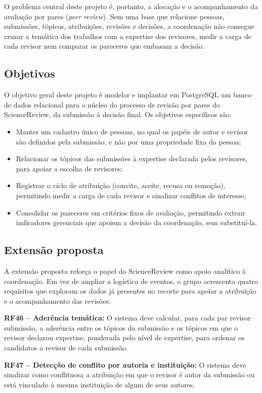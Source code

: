 \documentclass[12pt,a4paper]{article}
\begin{document}
O problema central deste projeto é, portanto, a alocação e o acompanhamento da
avaliação por pares (\textit{peer review}). Sem uma base que relacione pessoas,
submissões, tópicos, atribuições, revisões e decisões, a coordenação não consegue
cruzar a temática dos trabalhos com a expertise dos revisores, medir a carga de cada
revisor nem comparar os pareceres que embasam a decisão.

\subsection{Objetivos}
O objetivo geral deste projeto é modelar e implantar em PostgreSQL um banco de dados
relacional para o núcleo do processo de revisão por pares do ScienceReview, da
submissão à decisão final. Os objetivos específicos são:
\begin{itemize}
    \item Manter um cadastro único de pessoas, no qual os papéis de autor e revisor são definidos pela submissão, e não por uma propriedade fixa da pessoa;
    \item Relacionar os tópicos das submissões à expertise declarada pelos revisores, para apoiar a escolha de revisores;
    \item Registrar o ciclo de atribuição (convite, aceite, recusa ou remoção), permitindo medir a carga de cada revisor e sinalizar conflitos de interesse;
    \item Consolidar os pareceres em critérios fixos de avaliação, permitindo extrair indicadores gerenciais que apoiem a decisão da coordenação, sem substituí-la.
\end{itemize}

\subsection{Extensão proposta}\label{sec:extensao}
A extensão proposta reforça o papel do ScienceReview como apoio analítico à
coordenação. Em vez de ampliar a logística de eventos, o grupo acrescenta quatro
requisitos que exploram os dados já presentes no recorte para apoiar a atribuição e o
acompanhamento das revisões:

\textbf{RF46 -- Aderência temática:} O sistema deve calcular, para cada par
revisor--submissão, a aderência entre os tópicos da submissão e os tópicos em que o
revisor declarou expertise, ponderada pelo nível de expertise, para ordenar os
candidatos a revisor de cada submissão.

\textbf{RF47 -- Detecção de conflito por autoria e instituição:} O sistema deve
sinalizar como conflituosa a atribuição em que o revisor é autor da submissão ou está
vinculado à mesma instituição de algum de seus autores.
\end{document}
